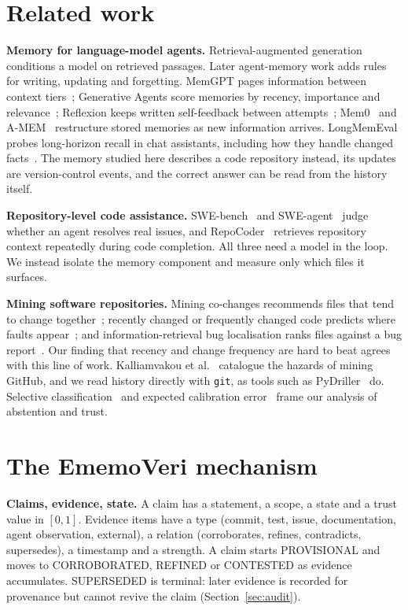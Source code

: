 \documentclass[runningheads]{llncs}
\newcommand{\sys}{EmemoVeri}
\begin{document}
\section{Related work}
\textbf{Memory for language-model agents.} Retrieval-augmented generation~\cite{lewis2020rag} conditions a model on retrieved passages. Later agent-memory work adds rules for writing, updating and forgetting. MemGPT pages information between context tiers~\cite{packer2023memgpt}; Generative Agents score memories by recency, importance and relevance~\cite{park2023generative}; Reflexion keeps written self-feedback between attempts~\cite{shinn2023reflexion}; Mem0~\cite{chhikara2025mem0} and A-MEM~\cite{xu2025amem} restructure stored memories as new information arrives. LongMemEval probes long-horizon recall in chat assistants, including how they handle changed facts~\cite{wu2024longmemeval}. The memory studied here describes a code repository instead, its updates are version-control events, and the correct answer can be read from the history itself.

\textbf{Repository-level code assistance.} SWE-bench~\cite{jimenez2024swebench} and SWE-agent~\cite{yang2024sweagent} judge whether an agent resolves real issues, and RepoCoder~\cite{zhang2023repocoder} retrieves repository context repeatedly during code completion. All three need a model in the loop. We instead isolate the memory component and measure only which files it surfaces.

\textbf{Mining software repositories.} Mining co-changes recommends files that tend to change together~\cite{zimmermann2005mining}; recently changed or frequently changed code predicts where faults appear~\cite{kim2007cache,hassan2009complexity}; and information-retrieval bug localisation ranks files against a bug report~\cite{zhou2012buglocator}. Our finding that recency and change frequency are hard to beat agrees with this line of work. Kalliamvakou et al.~\cite{kalliamvakou2014perils} catalogue the hazards of mining GitHub, and we read history directly with \texttt{git}, as tools such as PyDriller~\cite{spadini2018pydriller} do. Selective classification~\cite{geifman2017selective} and expected calibration error~\cite{guo2017calibration} frame our analysis of abstention and trust.

\section{The \sys{} mechanism}
\label{sec:mech}
\textbf{Claims, evidence, state.} A claim has a statement, a scope, a state and a trust value in $[0,1]$. Evidence items have a type (commit, test, issue, documentation, agent observation, external), a relation (corroborates, refines, contradicts, supersedes), a timestamp and a strength. A claim starts PROVISIONAL and moves to CORROBORATED, REFINED or CONTESTED as evidence accumulates. SUPERSEDED is terminal: later evidence is recorded for provenance but cannot revive the claim (Section~\ref{sec:audit}).
\end{document}
